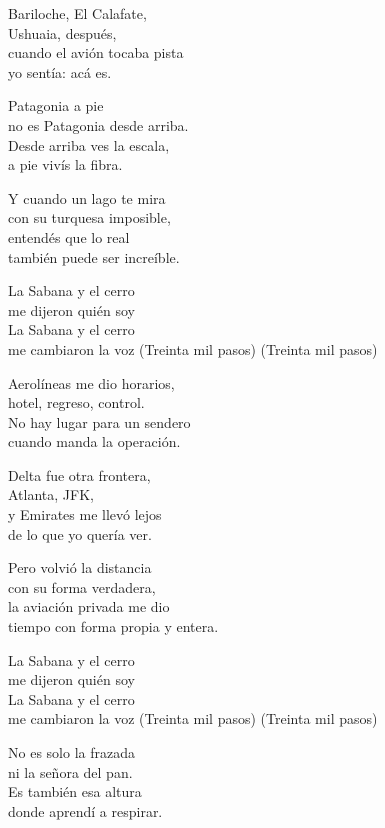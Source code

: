 \begin{lyrics}
Bariloche, El Calafate,\\
Ushuaia, después,\\
cuando el avión tocaba pista\\
yo sentía: acá es.

Patagonia a pie\\
no es Patagonia desde arriba.\\
Desde arriba ves la escala,\\
a pie vivís la fibra.

Y cuando un lago te mira\\
con su turquesa imposible,\\
entendés que lo real\\
también puede ser increíble.

La Sabana y el cerro\\
me dijeron quién soy\\
La Sabana y el cerro\\
me cambiaron la voz
(Treinta mil pasos)
(Treinta mil pasos)

Aerolíneas me dio horarios,\\
hotel, regreso, control.\\
No hay lugar para un sendero\\
cuando manda la operación.

Delta fue otra frontera,\\
Atlanta, JFK,\\
y Emirates me llevó lejos\\
de lo que yo quería ver.

Pero volvió la distancia\\
con su forma verdadera,\\
la aviación privada me dio\\
tiempo con forma propia y entera.

La Sabana y el cerro\\
me dijeron quién soy\\
La Sabana y el cerro\\
me cambiaron la voz
(Treinta mil pasos)
(Treinta mil pasos)

No es solo la frazada\\
ni la señora del pan.\\
Es también esa altura\\
donde aprendí a respirar.
\end{lyrics}

